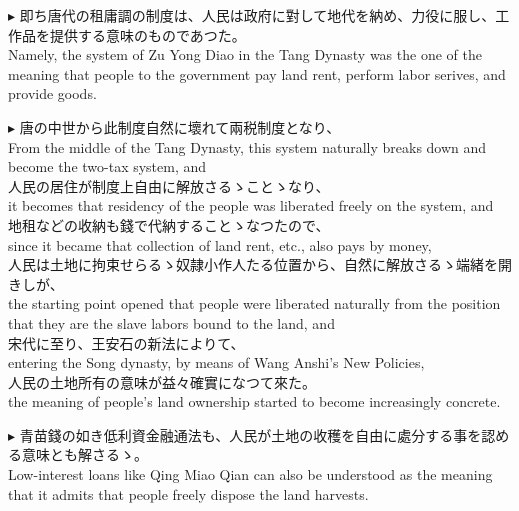 \documentclass{ctexart}
\makeatletter
\newcommand*{\shifttext}[1]{%
  \settowidth{\@tempdima}{#1}%
  \hspace{-\@tempdima}#1%
}
\newcommand{\plabel}[1]{%
\shifttext{\textbf{#1}\quad}%
}
\makeatother
\begin{document}
\vspace{1em}
\plabel{$\blacktriangleright$}%
即ち唐代の租\textperiodcentered 庸\textperiodcentered 調の制度は、人民は政府に對して地代を納め、力役に服し、工作品を提供する意味のものであつた。\\
Namely, the system of Zu Yong Diao in the Tang Dynasty was the one of the meaning that people to the government pay land rent, perform labor serives, and provide goods.

\vspace{1em}
\plabel{$\blacktriangleright$}%
唐の中世から此制度自然に壞れて兩税制度となり、\\
From the middle of the Tang Dynasty, this system naturally breaks down and become the two-tax system, and\\
人民の居住が制度上自由に解放さるゝことゝなり、\\
it becomes that residency of the people was liberated freely on the system, and\\
地租などの收納も錢で代納することゝなつたので、\\
since it became that collection of land rent, etc., also pays by money,\\
人民は土地に拘束せらるゝ奴隷小作人たる位置から、自然に解放さるゝ端緒を開きしが、\\
the starting point opened that people were liberated naturally from the position that they are the slave labors bound to the land, and\\
宋代に至り、王安石の新法によりて、\\
entering the Song dynasty, by means of Wang Anshi's New Policies,\\
人民の土地所有の意味が益々確實になつて來た。\\
the meaning of people's land ownership started to become increasingly concrete.

\vspace{1em}
\plabel{$\blacktriangleright$}%
青苗錢の如き低利資金融通法も、人民が土地の收穫を自由に處分する事を認める意味とも解さるゝ。\\
Low-interest loans like Qing Miao Qian can also be understood as the meaning that it admits that people freely dispose the land harvests.
\end{document}
